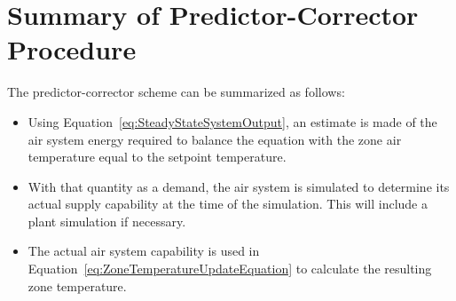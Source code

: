 \section{Summary of Predictor-Corrector Procedure}\label{summary-of-predictor-corrector-procedure}

The predictor-corrector scheme can be summarized as follows:

\begin{itemize}
\tightlist
\item
  Using Equation~\ref{eq:SteadyStateSystemOutput}, an estimate is made of the air system energy required to balance the equation with the zone air temperature equal to the setpoint temperature.
\item
  With that quantity as a demand, the air system is simulated to determine its actual supply capability at the time of the simulation. This will include a plant simulation if necessary.
\item
  The actual air system capability is used in Equation~\ref{eq:ZoneTemperatureUpdateEquation} to calculate the resulting zone temperature.
\end{itemize}
